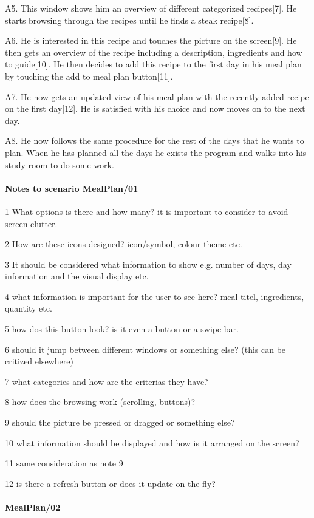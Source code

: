 	A5. This window shows him an overview of different categorized recipes[7]. He starts browsing through the recipes until he finds a steak recipe[8]. 
	
	A6. He is interested in this recipe and touches the picture on the screen[9]. He then gets an overview of the recipe including a description, ingredients and how to guide[10]. He then decides to add this recipe to the first day in his meal plan by touching the add to meal plan button[11].
	
	A7. He now gets an updated view of his meal plan with the recently added recipe on the first day[12]. He is satisfied with his choice and now moves on to the next day. 
	
	A8. He now follows the same procedure for the rest of the days that he wants to plan. When he has planned all the days he exists the program and walks into his study room to do some work.
	
\paragraph{Notes to scenario MealPlan/01}

1 What options is there and how many? it is important to consider to avoid screen clutter.

2 How are these icons designed? icon/symbol, colour theme etc.

3 It should be considered what information to show e.g. number of days, day information and the visual display etc.

4 what information is important for the user to see here? meal titel, ingredients, quantity etc.

5 how dos this button look? is it even a button or a swipe bar.

6 should it jump between different windows or something else? (this can be critized elsewhere)

7 what categories and how are the criterias they have?

8 how does the browsing work (scrolling, buttons)?

9 should the picture be pressed or dragged or something else?

10 what information should be displayed and how is it arranged on the screen?

11 same consideration as note 9

12 is there a refresh button or does it update on the fly?

\paragraph{MealPlan/02}

